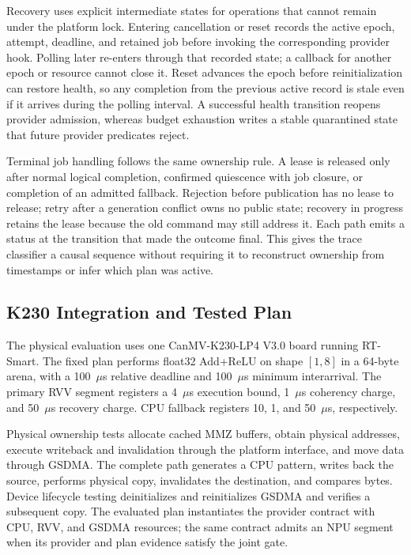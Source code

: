 \documentclass[lettersize,journal]{IEEEtran}
\begin{document}
Recovery uses explicit intermediate states for operations that cannot remain
under the platform lock. Entering cancellation or reset records the active
epoch, attempt, deadline, and retained job before invoking the corresponding
provider hook. Polling later re-enters through that recorded state; a callback
for another epoch or resource cannot close it. Reset advances the epoch before
reinitialization can restore health, so any completion from the previous active
record is stale even if it arrives during the polling interval. A successful
health transition reopens provider admission, whereas budget exhaustion writes
a stable quarantined state that future provider predicates reject.

Terminal job handling follows the same ownership rule. A lease is released
only after normal logical completion, confirmed quiescence with job closure, or
completion of an admitted fallback. Rejection before publication has no lease
to release; retry after a generation conflict owns no public state; recovery in
progress retains the lease because the old command may still address it. Each
path emits a status at the transition that made the outcome final. This gives
the trace classifier a causal sequence without requiring it to reconstruct
ownership from timestamps or infer which plan was active.

\subsection{K230 Integration and Tested Plan}
The physical evaluation uses one CanMV-K230-LP4 V3.0 board running RT-Smart.
The fixed plan performs float32 Add+ReLU on shape $[1,8]$ in a 64-byte arena,
with a 100~$\mu$s relative deadline and 100~$\mu$s minimum interarrival. The
primary RVV segment registers a 4~$\mu$s execution bound, 1~$\mu$s coherency
charge, and 50~$\mu$s recovery charge. CPU fallback registers 10, 1, and
50~$\mu$s, respectively.

Physical ownership tests allocate cached MMZ buffers, obtain physical
addresses, execute writeback and invalidation through the platform interface,
and move data through GSDMA. The complete path generates a CPU pattern, writes
back the source, performs physical copy, invalidates the destination, and
compares bytes. Device lifecycle testing deinitializes and reinitializes GSDMA
and verifies a subsequent copy. The evaluated plan instantiates the provider
contract with CPU, RVV, and GSDMA resources; the same contract admits an NPU
segment when its provider and plan evidence satisfy the joint gate.
\end{document}
